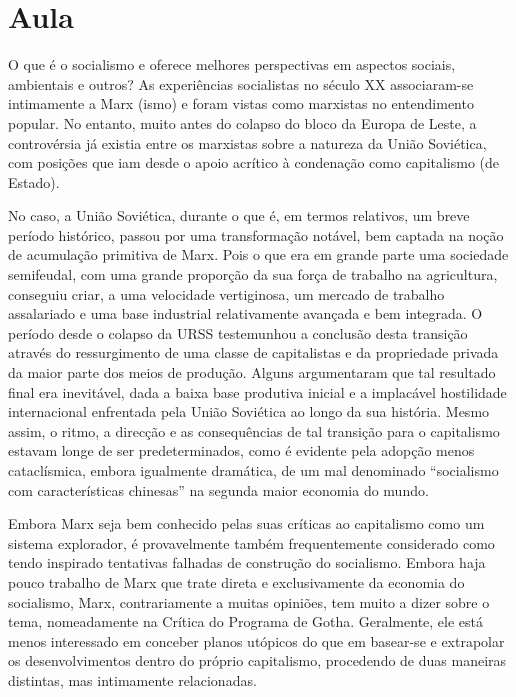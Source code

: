 \section{Aula}
 \par 
O que é o socialismo e oferece melhores perspectivas em aspectos sociais, ambientais e outros? As experiências socialistas no século XX associaram-se intimamente a Marx (ismo) e foram vistas como marxistas no entendimento popular. No entanto, muito antes do colapso do bloco da Europa de Leste, a controvérsia já existia entre os marxistas sobre a natureza da União Soviética, com posições que iam desde o apoio acrítico à condenação como capitalismo (de Estado).
 \par 
No caso, a União Soviética, durante o que é, em termos relativos, um breve período histórico, passou por uma transformação notável, bem captada na noção de acumulação primitiva de Marx. Pois o que era em grande parte uma sociedade semifeudal, com uma grande proporção da sua força de trabalho na agricultura, conseguiu criar, a uma velocidade vertiginosa, um mercado de trabalho assalariado e uma base industrial relativamente avançada e bem integrada. O período desde o colapso da URSS testemunhou a conclusão desta transição através do ressurgimento de uma classe de capitalistas e da propriedade privada da maior parte dos meios de produção. Alguns argumentaram que tal resultado final era inevitável, dada a baixa base produtiva inicial e a implacável hostilidade internacional enfrentada pela União Soviética ao longo da sua história. Mesmo assim, o ritmo, a direcção e as consequências de tal transição para o capitalismo estavam longe de ser predeterminados, como é evidente pela adopção menos cataclísmica, embora igualmente dramática, de um mal denominado “socialismo com características chinesas” na segunda maior economia do mundo.
 \par 
Embora Marx seja bem conhecido pelas suas críticas ao capitalismo como um sistema explorador, é provavelmente também frequentemente considerado como tendo inspirado tentativas falhadas de construção do socialismo. Embora haja pouco trabalho de Marx que trate direta e exclusivamente da economia do socialismo, Marx, contrariamente a muitas opiniões, tem muito a dizer sobre o tema, nomeadamente na Crítica do Programa de Gotha. Geralmente, ele está menos interessado em conceber planos utópicos do que em basear-se e extrapolar os desenvolvimentos dentro do próprio capitalismo, procedendo de duas maneiras distintas, mas intimamente relacionadas.
 \par 
